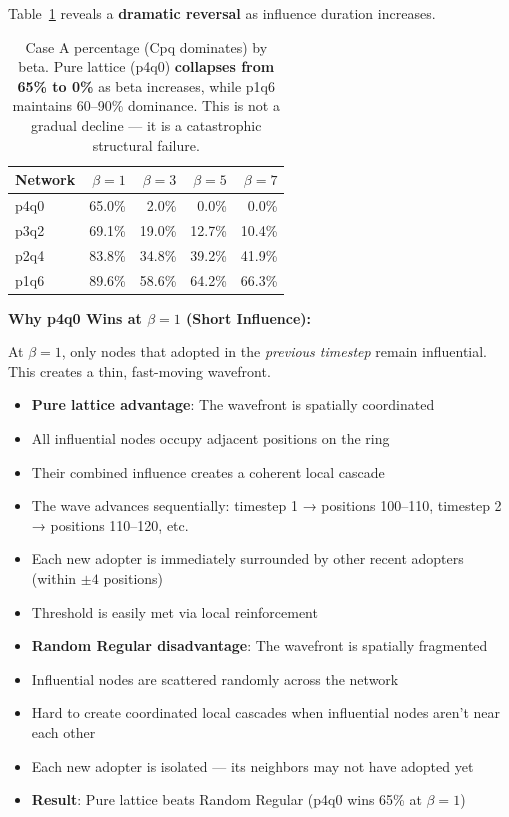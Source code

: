 \documentclass[12pt,a4paper]{article}
\begin{document}
Table~\ref{tab:beta_collapse} reveals a \textbf{dramatic reversal} as influence duration increases.

\begin{table}[H]
\centering
\begin{tabular}{@{}lrrrr@{}}
\toprule
\textbf{Network} & \textbf{$\beta=1$} & \textbf{$\beta=3$} & \textbf{$\beta=5$} & \textbf{$\beta=7$} \\
\midrule
p4q0 & 65.0\% & 2.0\% & 0.0\% & 0.0\% \\
p3q2 & 69.1\% & 19.0\% & 12.7\% & 10.4\% \\
p2q4 & 83.8\% & 34.8\% & 39.2\% & 41.9\% \\
p1q6 & 89.6\% & 58.6\% & 64.2\% & 66.3\% \\
\bottomrule
\end{tabular}
\caption{Case A percentage (Cpq dominates) by beta. Pure lattice (p4q0) \textbf{collapses from 65\% to 0\%} as beta increases, while p1q6 maintains 60--90\% dominance. This is not a gradual decline --- it is a catastrophic structural failure.}
\label{tab:beta_collapse}
\end{table}

\textbf{Why p4q0 Wins at $\beta=1$ (Short Influence):}

At $\beta=1$, only nodes that adopted in the \textit{previous timestep} remain influential. This creates a thin, fast-moving wavefront.

\begin{itemize}
    \item \textbf{Pure lattice advantage}: The wavefront is spatially coordinated
    \item All influential nodes occupy adjacent positions on the ring
    \item Their combined influence creates a coherent local cascade
    \item The wave advances sequentially: timestep 1 → positions 100--110, timestep 2 → positions 110--120, etc.
    \item Each new adopter is immediately surrounded by other recent adopters (within $\pm 4$ positions)
    \item Threshold is easily met via local reinforcement
    \item \textbf{Random Regular disadvantage}: The wavefront is spatially fragmented
    \item Influential nodes are scattered randomly across the network
    \item Hard to create coordinated local cascades when influential nodes aren't near each other
    \item Each new adopter is isolated --- its neighbors may not have adopted yet
    \item \textbf{Result}: Pure lattice beats Random Regular (p4q0 wins 65\% at $\beta=1$)
\end{itemize}
\end{document}

